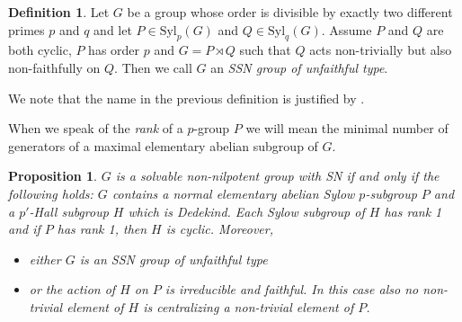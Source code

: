 \documentclass[a4paper,10pt]{amsart}
\newtheorem{proposition}[lemma]{Proposition}
\theoremstyle{definition}
\newtheorem{definition}[lemma]{Definition}
\theoremstyle{remark}
\begin{document}
\begin{definition}\label{Defintion solv SSN unfaithful type}
Let $G$ be a group whose order is divisible by exactly two different primes $p$ and $q$ and let $P \in \text{Syl}_p(G)$ and $Q \in \text{Syl}_q(G)$. Assume $P$ and $Q$ are both cyclic, $P$ has order $p$ and $G = P \rtimes Q$ such that $Q$ acts non-trivially but also non-faithfully on $Q$. Then we call $G$ an \textit{SSN group of unfaithful type}.
\end{definition}
We note that the name in the previous definition is justified by \cite[Theorem 2.7]{LiuPassman16}.

When we speak of the \textit{rank} of a $p$-group $P$ we will mean the minimal number of generators of a maximal elementary abelian subgroup of $G$.

\begin{proposition}\label{prop:SolvSNGroups}
$G$ is a solvable non-nilpotent group with SN if and only if the following holds: $G$ contains a normal elementary abelian Sylow $p$-subgroup $P$ and a $p'$-Hall subgroup $H$ which is Dedekind. Each Sylow subgroup of $H$ has rank 1 and if $P$ has rank 1, then $H$ is cyclic. Moreover, 
\begin{itemize}
\item[(i)] either $G$ is an SSN group of unfaithful type
\item[(ii)] or the action of $H$ on $P$ is irreducible and faithful. In this case also no non-trivial element of $H$ is centralizing a non-trivial element of $P$.
\end{itemize}
\end{proposition}
\end{document}
